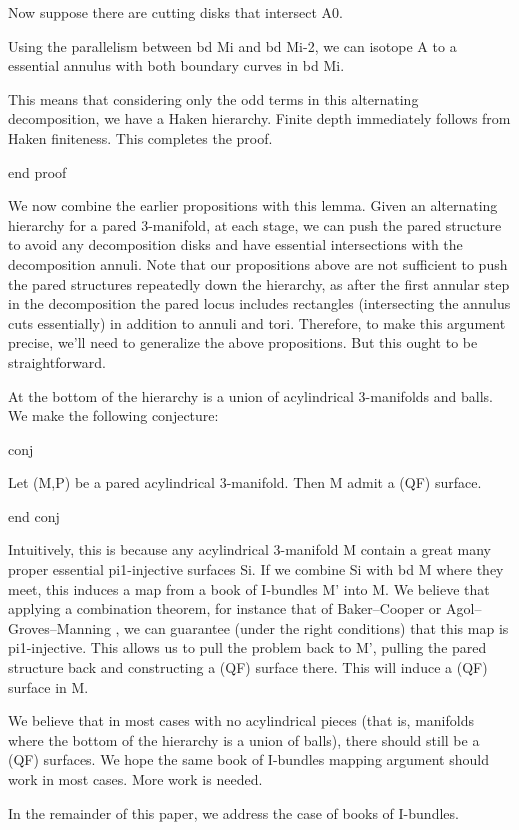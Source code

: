Now suppose there are cutting disks that intersect A0.

Using the parallelism between bd Mi and bd Mi-2, we can isotope A to
a essential annulus with both boundary curves in bd Mi.

This means that considering only the odd terms in this alternating
decomposition, we have a Haken hierarchy. Finite depth immediately follows from
Haken finiteness. This completes the proof.

end proof

We now combine the earlier propositions with this lemma. Given an alternating
hierarchy for a pared 3-manifold, at each stage, we can push the pared
structure to avoid any decomposition disks and have essential intersections
with the decomposition annuli. Note that our propositions above are not
sufficient to push the pared structures repeatedly down the hierarchy, as after
the first annular step in the decomposition the pared locus includes rectangles
(intersecting the annulus cuts essentially) in addition to annuli and tori.
Therefore, to make this argument precise, we'll need to generalize the above
propositions. But this ought to be straightforward.

At the bottom of the hierarchy is a union of acylindrical 3-manifolds and
balls. We make the following conjecture:

conj

Let (M,P) be a pared acylindrical 3-manifold. Then M admit a (QF) surface.

end conj

Intuitively, this is because any acylindrical 3-manifold M contain a great many
proper essential pi1-injective surfaces Si. If we combine Si with bd M where
they meet, this induces a map from a book of I-bundles M' into M. We believe
that applying a combination theorem, for instance that of Baker--Cooper
\cite{BCcombination} or Agol--Groves--Manning \cite{AGMcombination}, we can
guarantee (under the right conditions) that this map is pi1-injective. This
allows us to pull the problem back to M', pulling the pared structure back and
constructing a (QF) surface there. This will induce a (QF) surface in M.

We believe that in most cases with no acylindrical pieces (that is, manifolds
where the bottom of the hierarchy is a union of balls), there should still be
a (QF) surfaces. We hope the same book of I-bundles mapping argument should
work in most cases. More work is needed.

In the remainder of this paper, we address the case of books of I-bundles.
